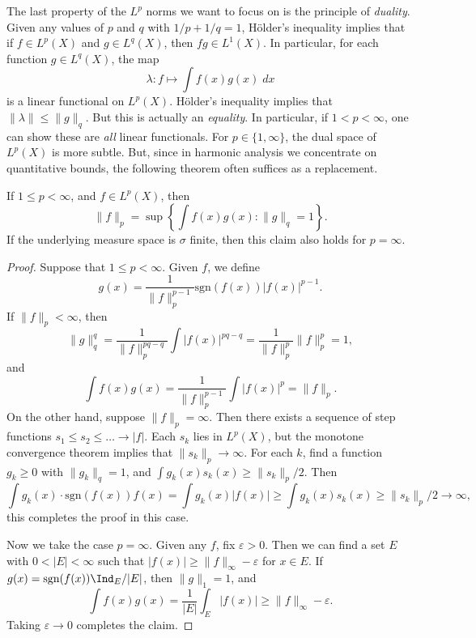 The last property of the $L^p$ norms we want to focus on is the principle of \emph{duality}. Given any values of $p$ and $q$ with $1/p + 1/q = 1$, H\"{o}lder's inequality implies that if $f \in L^p(X)$ and $g \in L^q(X)$, then $fg \in L^1(X)$. In particular, for each function $g \in L^q(X)$, the map
%
\[ \lambda: f \mapsto \int f(x)g(x)\; dx \]
%
is a linear functional on $L^p(X)$. H\"{o}lder's inequality implies that $\| \lambda \| \leq \| g \|_q$. But this is actually an \emph{equality}. In particular, if $1 < p < \infty$, one can show these are \emph{all} linear functionals. For $p \in \{ 1, \infty \}$, the dual space of $L^p(X)$ is more subtle. But, since in harmonic analysis we concentrate on quantitative bounds, the following theorem often suffices as a replacement.

\begin{theorem}
    If $1 \leq p < \infty$, and $f \in L^p(X)$, then
    \[ \| f \|_p = \sup \left\{ \int f(x)g(x) : \| g \|_q = 1 \right\}. \]
    If the underlying measure space is $\sigma$ finite, then this claim also holds for $p = \infty$.
\end{theorem}
\begin{proof}
    Suppose that $1 \leq p < \infty$. Given $f$, we define
    \[ g(x) = \frac{1}{\| f \|_p^{p-1}} \text{sgn}(f(x)) |f(x)|^{p-1}. \]
    If $\| f \|_p < \infty$, then
    \[ \| g \|_q^q = \frac{1}{\| f \|_p^{pq - q}} \int |f(x)|^{pq-q} = \frac{1}{\| f \|_p^p} \| f \|_p^p = 1, \]
    and
    \[ \int f(x) g(x) = \frac{1}{\| f \|_p^{p-1}} \int |f(x)|^p = \| f \|_p. \]
    On the other hand, suppose $\| f \|_p = \infty$. Then there exists a sequence of step functions $s_1 \leq s_2 \leq \dots \to |f|$. Each $s_k$ lies in $L^p(X)$, but the monotone convergence theorem implies that $\| s_k \|_p \to \infty$. For each $k$, find a function $g_k \geq 0$ with $\| g_k \|_q = 1$, and $\int g_k(x) s_k(x) \geq \| s_k \|_p / 2$. Then
    \[ \int g_k(x) \cdot \text{sgn}(f(x)) f(x) = \int g_k(x) |f(x)| \geq \int g_k(x) s_k(x) \geq \| s_k \|_p / 2 \to \infty, \]
    this completes the proof in this case.

    Now we take the case $p = \infty$. Given any $f$, fix $\varepsilon > 0$. Then we can find a set $E$ with $0 < |E| < \infty$ such that $|f(x)| \geq \| f \|_\infty - \varepsilon$ for $x \in E$. If $g(x) = \text{sgn}(f(x)) \Ind_E / |E|$, then $\| g \|_1 = 1$, and
    \[ \int f(x) g(x) = \frac{1}{|E|} \int_E |f(x)| \geq \| f \|_\infty - \varepsilon. \]
    Taking $\varepsilon \to 0$ completes the claim.
\end{proof}


